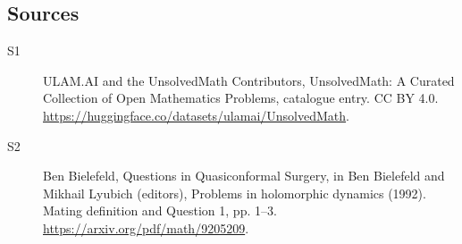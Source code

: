 \documentclass[11pt]{article}
\begin{document}
\subsection{Sources}
\begin{description}
\item[\hypertarget{source:statement:1}{S1}] ULAM.AI and the UnsolvedMath Contributors, UnsolvedMath: A Curated Collection of Open Mathematics Problems, catalogue entry. CC BY 4.0. \url{https://huggingface.co/datasets/ulamai/UnsolvedMath}.
\item[\hypertarget{source:statement:2}{S2}] Ben Bielefeld, Questions in Quasiconformal Surgery, in Ben Bielefeld and Mikhail Lyubich (editors), Problems in holomorphic dynamics (1992). Mating definition and Question 1, pp. 1–3. \url{https://arxiv.org/pdf/math/9205209}.
\end{description}
\label{end:statement}
\end{document}
